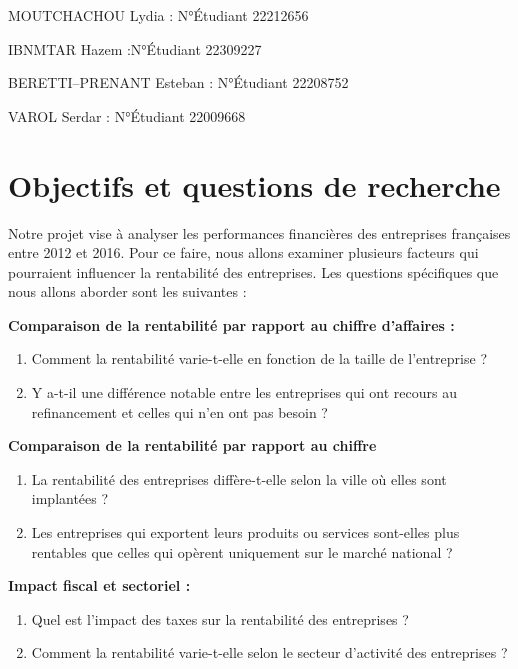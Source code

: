 \documentclass[mstat,12pt]{unswthesis}
\begin{document}
MOUTCHACHOU Lydia : N°Étudiant 22212656

IBNMTAR Hazem :N°Étudiant 22309227

BERETTI--PRENANT Esteban : N°Étudiant 22208752

VAROL Serdar : N°Étudiant 22009668

\bigskip

\section{Objectifs et questions de
recherche}\label{objectifs-et-questions-de-recherche}

Notre projet vise à analyser les performances financières des
entreprises françaises entre 2012 et 2016. Pour ce faire, nous allons
examiner plusieurs facteurs qui pourraient influencer la rentabilité des
entreprises. Les questions spécifiques que nous allons aborder sont les
suivantes :

\medskip

\textbf{Comparaison de la rentabilité par rapport au chiffre d'affaires
:}

\begin{enumerate}
\def\labelenumi{\alph{enumi}.}
\item
  Comment la rentabilité varie-t-elle en fonction de la taille de
  l'entreprise ?
\item
  Y a-t-il une différence notable entre les entreprises qui ont recours
  au refinancement et celles qui n'en ont pas besoin ?
\end{enumerate}

\textbf{Comparaison de la rentabilité par rapport au chiffre}

\begin{enumerate}
\def\labelenumi{\alph{enumi}.}
\item
  La rentabilité des entreprises diffère-t-elle selon la ville où elles
  sont implantées ?
\item
  Les entreprises qui exportent leurs produits ou services sont-elles
  plus rentables que celles qui opèrent uniquement sur le marché
  national ?
\end{enumerate}

\textbf{Impact fiscal et sectoriel :}

\begin{enumerate}
\def\labelenumi{\alph{enumi}.}
\item
  Quel est l'impact des taxes sur la rentabilité des entreprises ?
\item
  Comment la rentabilité varie-t-elle selon le secteur d'activité des
  entreprises ?
\end{enumerate}
\end{document}
